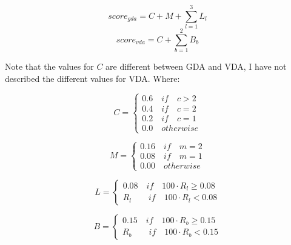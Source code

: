 $$ score_{gda} = C + M + \sum_{l=1}^3 L_l $$
$$ score_{vda} = C + \sum_{b=1}^2 B_b $$

Note that the values for $C$ are different between GDA and VDA, I have not described the different values for VDA. Where:

\[
C =
\left\{
 \begin{array}{l}
  0.6 \quad if \quad c > 2 \\
  0.4 \quad if \quad c = 2 \\
  0.2 \quad if \quad c = 1 \\
  0.0 \quad otherwise
 \end{array}
\right.
\]

\[
M =
\left\{
 \begin{array}{l}
  0.16 \quad if \quad m = 2 \\
  0.08 \quad if \quad m = 1 \\
  0.00 \quad otherwise
 \end{array}
\right.
\]

\[
L =
\left\{
 \begin{array}{l}
  0.08 \quad if \quad 100 \cdot R_l \geq 0.08 \\
  R_l \quad\quad if \quad 100 \cdot R_l < 0.08
 \end{array}
\right.
\]

\[
B =
\left\{
 \begin{array}{l}
  0.15 \quad if \quad 100 \cdot R_b \geq 0.15 \\
  R_b \quad\quad if \quad 100 \cdot R_b < 0.15
 \end{array}
\right.
\]

\begin{table}[H]
    \centering
    \caption{Meaning of the variables for the GDA score in DisGeNET \label{tab:equationDisgenet}}
\end{table}

